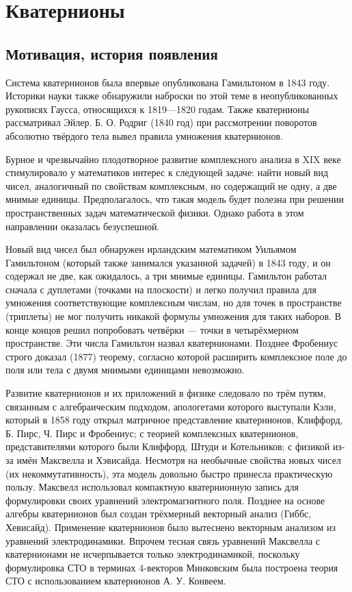 \documentclass[14pt,Report]{diplomwork}
\begin{document}
			\chapter{Кватернионы}
				\section{Мотивация, история появления}

					Система кватернионов была впервые опубликована Гамильтоном в 1843 году. Историки науки также обнаружили наброски по этой теме в неопубликованных рукописях Гаусса, относящихся к 1819—1820 годам. Также кватернионы рассматривал Эйлер. Б. О. Родриг (1840 год) при рассмотрении поворотов абсолютно твёрдого тела вывел правила умножения кватернионов.

					Бурное и чрезвычайно плодотворное развитие комплексного анализа в XIX веке стимулировало у математиков интерес к следующей задаче: найти новый вид чисел, аналогичный по свойствам комплексным, но содержащий не одну, а две мнимые единицы. Предполагалось, что такая модель будет полезна при решении пространственных задач математической физики. Однако работа в этом направлении оказалась безуспешной.

					Новый вид чисел был обнаружен ирландским математиком Уильямом Гамильтоном (который также занимался указанной задачей) в 1843 году, и он содержал не две, как ожидалось, а три мнимые единицы. Гамильтон работал сначала с дуплетами (точками на плоскости) и легко получил правила для умножения соответствующие комплексным числам, но для точек в пространстве (триплеты) не мог получить никакой формулы умножения для таких наборов. В конце концов решил попробовать четвёрки — точки в четырёхмерном пространстве. Эти числа Гамильтон назвал кватернионами. Позднее Фробениус строго доказал (1877) теорему, согласно которой расширить комплексное поле до поля или тела с двумя мнимыми единицами невозможно.

					Развитие кватернионов и их приложений в физике следовало по трём путям, связанным с алгебраическим подходом, апологетами которого выступали Кэли, который в 1858 году открыл матричное представление кватернионов, Клиффорд, Б. Пирс, Ч. Пирс и Фробениус; с теорией комплексных кватернионов, представителями которого были Клиффорд, Штуди и Котельников; с физикой из-за имён Максвелла и Хэвисайда. Несмотря на необычные свойства новых чисел (их некоммутативность), эта модель довольно быстро принесла практическую пользу. Максвелл использовал компактную кватернионную запись для формулировки своих уравнений электромагнитного поля. Позднее на основе алгебры кватернионов был создан трёхмерный векторный анализ (Гиббс, Хевисайд). Применение кватернионов было вытеснено векторным анализом из уравнений электродинамики. Впрочем тесная связь уравнений Максвелла с кватернионами не исчерпывается только электродинамикой, поскольку формулировка СТО в терминах 4-векторов Минковским была построена теория СТО с использованием кватернионов А. У. Конвеем.
\end{document}
